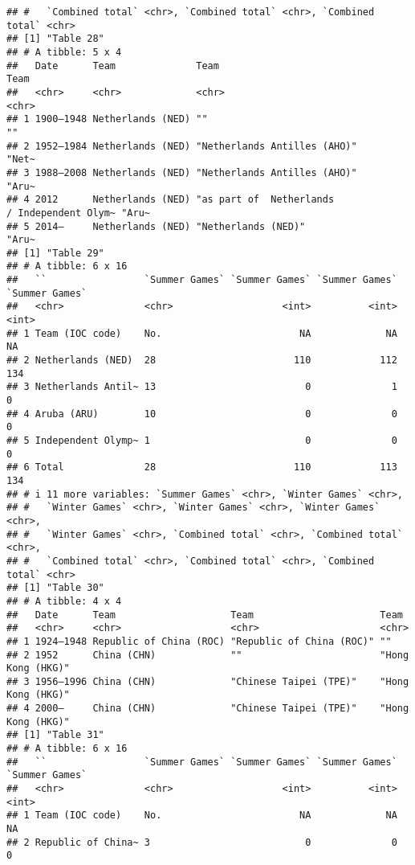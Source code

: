 \documentclass[
]{article}
\begin{document}
\begin{verbatim}
## #   `Combined total` <chr>, `Combined total` <chr>, `Combined total` <chr>
## [1] "Table 28"
## # A tibble: 5 x 4
##   Date      Team              Team                                         Team 
##   <chr>     <chr>             <chr>                                        <chr>
## 1 1900–1948 Netherlands (NED) ""                                           ""   
## 2 1952–1984 Netherlands (NED) "Netherlands Antilles (AHO)"                 "Net~
## 3 1988–2008 Netherlands (NED) "Netherlands Antilles (AHO)"                 "Aru~
## 4 2012      Netherlands (NED) "as part of  Netherlands / Independent Olym~ "Aru~
## 5 2014–     Netherlands (NED) "Netherlands (NED)"                          "Aru~
## [1] "Table 29"
## # A tibble: 6 x 16
##   ``                 `Summer Games` `Summer Games` `Summer Games` `Summer Games`
##   <chr>              <chr>                   <int>          <int>          <int>
## 1 Team (IOC code)    No.                        NA             NA             NA
## 2 Netherlands (NED)  28                        110            112            134
## 3 Netherlands Antil~ 13                          0              1              0
## 4 Aruba (ARU)        10                          0              0              0
## 5 Independent Olymp~ 1                           0              0              0
## 6 Total              28                        110            113            134
## # i 11 more variables: `Summer Games` <chr>, `Winter Games` <chr>,
## #   `Winter Games` <chr>, `Winter Games` <chr>, `Winter Games` <chr>,
## #   `Winter Games` <chr>, `Combined total` <chr>, `Combined total` <chr>,
## #   `Combined total` <chr>, `Combined total` <chr>, `Combined total` <chr>
## [1] "Table 30"
## # A tibble: 4 x 4
##   Date      Team                    Team                      Team             
##   <chr>     <chr>                   <chr>                     <chr>            
## 1 1924–1948 Republic of China (ROC) "Republic of China (ROC)" ""               
## 2 1952      China (CHN)             ""                        "Hong Kong (HKG)"
## 3 1956–1996 China (CHN)             "Chinese Taipei (TPE)"    "Hong Kong (HKG)"
## 4 2000–     China (CHN)             "Chinese Taipei (TPE)"    "Hong Kong (HKG)"
## [1] "Table 31"
## # A tibble: 6 x 16
##   ``                 `Summer Games` `Summer Games` `Summer Games` `Summer Games`
##   <chr>              <chr>                   <int>          <int>          <int>
## 1 Team (IOC code)    No.                        NA             NA             NA
## 2 Republic of China~ 3                           0              0              0

\end{verbatim}
\end{document}
